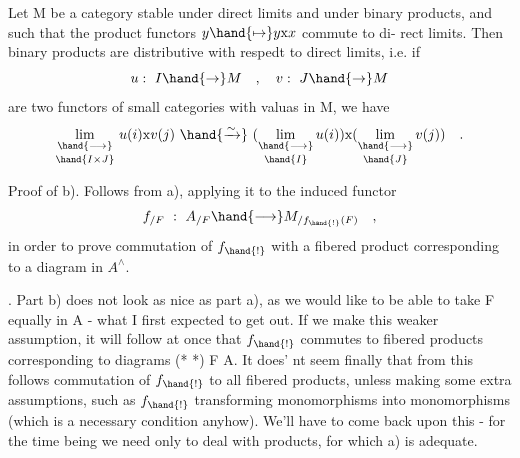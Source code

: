 
\hand{\uline{\textcolor{black}{Lemma.}}} Let M be a category stable under direct limits and under binary
products, and such that the product functors $y\hand{\mapsto} y\mathrm{x}x$ commute to di-%
rect limits. Then binary products are distributive with respedt to
direct limits, i.e. if
\[ u:\ I\hand{\to} M \quad , \quad v:\ J\hand{\to} M \]
are two functors of small categories with valuas in M, we have
\[ \underset{\hand{I\times J}}{\underset{\hand{\longrightarrow}}{\mathrm{lim}}}\ u(i)\mathrm{x}v(j)\ \hand{\xrightarrow{\sim}}\ (\underset{\hand{I}}{\underset{\hand{\longrightarrow}}{\mathrm{lim}}}\, u(i))\mathrm{x}(\underset{\hand{J}}{\underset{\hand{\longrightarrow}}{\mathrm{lim}}}\, v(j)) \quad . \]

Proof of b). Follows from a), applying it to the induced functor
\[ f_{/F}\ :\ A_{/F}\hand{\longrightarrow} M_{/f_{\hand{!}}(F)} \quad , \]
in order to prove commutation of $f_{\hand{!}}$ with a fibered product corresponding
to a diagram
in $A^\wedge$.

\hand{\uline{\textcolor{black}{Remark}}}. Part b) does not look as nice as part a), as we would like to
be able to take F equally in A - what I first expected to get out. If
we make  this weaker assumption, it will follow at once that $f_{\hand{!}}$ commutes
to fibered products corresponding to diagrams (* *) \hand{\uline{\textcolor{black}{with}}} F \hand{\uline{\textcolor{black}{in}}} A. It does'%
nt seem finally that from this follows commutation of $f_{\hand{!}}$ to all fibered
products, unless making some extra assumptions, such as $f_{\hand{!}}$ transforming
monomorphisms into monomorphisms (which is a necessary condition anyhow).
We'll have to come back upon this - for the time being we need only to 
deal with products, for which a) is adequate.

